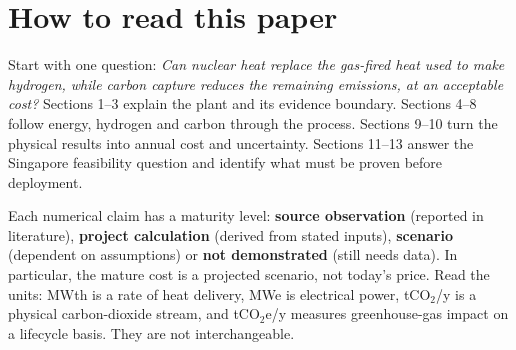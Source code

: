 \section*{How to read this paper}
Start with one question: \emph{Can nuclear heat replace the gas-fired heat used to make hydrogen, while carbon capture reduces the remaining emissions, at an acceptable cost?} Sections 1--3 explain the plant and its evidence boundary. Sections 4--8 follow energy, hydrogen and carbon through the process. Sections 9--10 turn the physical results into annual cost and uncertainty. Sections 11--13 answer the Singapore feasibility question and identify what must be proven before deployment.

Each numerical claim has a maturity level: \textbf{source observation} (reported in literature), \textbf{project calculation} (derived from stated inputs), \textbf{scenario} (dependent on assumptions) or \textbf{not demonstrated} (still needs data). In particular, the mature cost is a projected scenario, not today's price. Read the units: MWth is a rate of heat delivery, MWe is electrical power, tCO$_2$/y is a physical carbon-dioxide stream, and tCO$_2$e/y measures greenhouse-gas impact on a lifecycle basis. They are not interchangeable.

